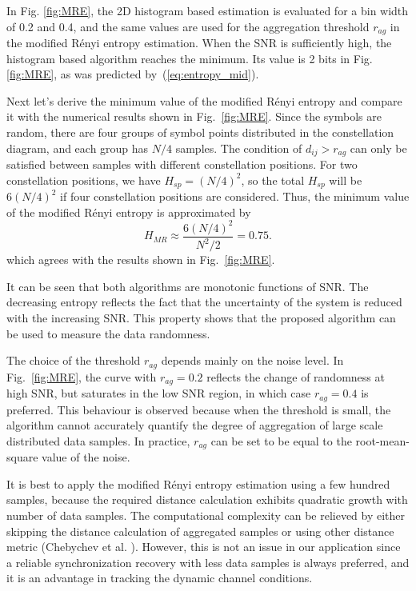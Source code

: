 \documentclass[journal,comsoc,onecolumn, 12pt,draftclsnofoot]{IEEEtran}
\begin{document}
In Fig. \ref{fig:MRE}, the 2D histogram based estimation is evaluated for a bin width of 0.2 and 0.4, and the same values are used for the aggregation threshold \(r_{ag}\) in the modified R\'enyi entropy estimation.
When the SNR is sufficiently high, the histogram based algorithm reaches the minimum. 
Its value is 2 bits in Fig. \ref{fig:MRE}, as was predicted by~(\ref{eq:entropy_mid}).

Next let's derive the minimum value of the modified R\'enyi entropy and compare it with the numerical results shown in Fig.~\ref{fig:MRE}.
Since the symbols are random, there are four groups of symbol points distributed in the constellation diagram, and each group has \(N/4\) samples.
The condition of $d_{ij}>r_{ag}$ can only be satisfied between samples with different constellation positions.
For two constellation positions, we have $H_{sp} = (N/4)^2$, so the total $H_{sp}$ will be $6 (N/4)^2$ if four constellation positions are considered.
Thus, the minimum value of the modified R\'enyi entropy is approximated by
\begin{equation}
H_{MR} \approx \frac{ 6 \left(N/4\right)^2}{N^2/2}=0.75.
\label{eq:adEntQPSK}
\end{equation}
which agrees with the results shown in Fig.~\ref{fig:MRE}.


It can be seen that both algorithms are monotonic functions of SNR.
The decreasing entropy reflects the fact that the uncertainty of the system is reduced with the increasing SNR.
This property shows that the proposed algorithm can be used to measure the data randomness.

The choice of the threshold \(r_{ag}\) depends mainly on the noise level.
In Fig.~\ref{fig:MRE}, the curve with \(r_{ag}=0.2\) reflects the change of randomness at high SNR, but saturates in the low SNR region, in which case \(r_{ag}=0.4\) is preferred.
This behaviour is observed because when the threshold is small, the algorithm cannot accurately quantify the degree of aggregation of large scale distributed data samples.
In practice, $r_{ag}$ can be set to be equal to the root-mean-square value of the noise.

It is best to apply the modified R\'enyi entropy estimation using a few hundred samples,
because the required distance calculation exhibits quadratic growth with number of data samples. 
The computational complexity can be relieved by either skipping the distance calculation of aggregated samples or using other distance metric (Chebychev et al. \cite{Cha2007}).
However, this is not an issue in our application since a reliable synchronization  recovery with less data samples is always preferred, and it is an advantage in tracking the dynamic channel conditions. 
\end{document}
